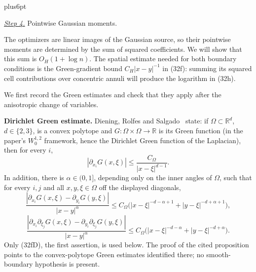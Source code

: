 \documentclass[11pt,reqno]{amsart}
\makeatletter
\theoremstyle{plain}
\theoremstyle{definition}
\theoremstyle{remark}
\renewenvironment{proof}[1][\proofname]{%
  \par
  \pushQED{\qed}%
  \normalfont
  \topsep6pt plus6pt\relax
  \trivlist
  \item[\hskip\labelsep\slshape #1\@addpunct{.}]%
  \ignorespaces
}{%
  \popQED
  \endtrivlist
  \@endpefalse
}
\DeclareRobustCommand{\qed}{%
  \leavevmode\unskip\penalty9999\hbox{}\nobreak
  \ifmmode
    \makebox[0pt][l]{\qquad\hbox{\qedsymbol}}%
  \else
    \qquad\hbox{\qedsymbol}%
  \fi
}
\renewcommand{\qedsymbol}{\rule[.47pt]{4pt}{6pt}}
\numberwithin{equation}{section}
\newcommand{\1}{\mathbf 1}
\makeatother
\begin{document}
\begin{proof}
\smallskip\noindent
\underline{\textit{Step 4.}} Pointwise Gaussian moments.

The optimizers are linear images of the Gaussian source, so their
pointwise moments are determined by the sum of squared coefficients.
We will show that this sum is $O_H(1+\log n)$.  The spatial estimate
needed for both boundary conditions is the Green-gradient bound
$C_H|x-y|^{-1}$ in (32f): summing its squared cell contributions over
concentric annuli will produce the logarithm in (32h).

We first record the Green estimates and check that they apply after
the anisotropic change of variables.

\textbf{Dirichlet Green estimate.}  Diening, Rolfes and Salgado~\cite[Proposition 4.1]{DRS2024} state: if
$\Omega\subset\mathbb R^d$, $d\in\{2,3\}$, is a convex polytope and
$G:\Omega\times\Omega\to\mathbb R$ is its Green function (in the
paper's $W^{1,2}_ 0$ framework, hence the Dirichlet Green function of
the Laplacian), then for every $i$,
\begin{equation}
|\partial_ {x_ i}G(x,\xi)|\leq \frac{C_\Omega}{|x-\xi|^{d-1}}.
\tag{32fD}
\end{equation}
In addition, there is $\alpha\in(0,1]$, depending only on the inner
angles of $\Omega$, such that for every $i,j$ and all
$x,y,\xi\in\Omega$ off the displayed diagonals,
\begin{equation*}
\frac{|\partial_{x_i}G(x,\xi)-\partial_{y_i}G(y,\xi)|}{|x-y|^\alpha}
\leq C_ \Omega\bigl(
|x-\xi|^{-d-\alpha+1}+|y-\xi|^{-d+\alpha+1}\bigr),
\end{equation*}
\begin{equation*}
\frac{|\partial_{x_i}\partial_{\xi_j}G(x,\xi)-\partial_{y_i}\partial_{\xi_j}G(y,\xi)|}{|x-y|^\alpha}
\leq C_ \Omega\bigl(
|x-\xi|^{-d-\alpha}+|y-\xi|^{-d+\alpha}\bigr).
\end{equation*}
Only (32fD), the first assertion, is used below.  The proof of the cited
proposition points to the convex-polytope Green estimates identified there;
no smooth-boundary hypothesis is present.


\end{proof}
\end{document}
